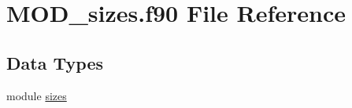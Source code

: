\hypertarget{MOD__sizes_8f90}{\section{M\-O\-D\-\_\-sizes.\-f90 File Reference}
\label{MOD__sizes_8f90}
}
\subsection*{Data Types}
\begin{DoxyCompactItemize}
\item 
module \hyperlink{classsizes}{sizes}
\end{DoxyCompactItemize}
